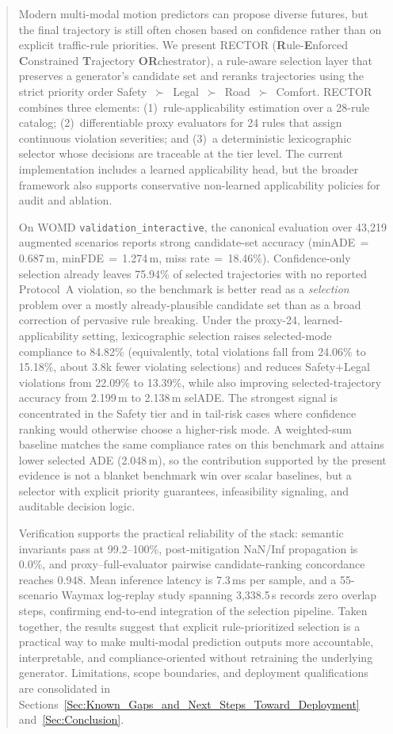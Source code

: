 \documentclass[lettersize,journal, twocolumn]{IEEEtran}
\begin{document}
\begin{abstract}
Modern multi-modal motion predictors can propose diverse futures, but the final trajectory is still often chosen based on confidence rather than on explicit traffic-rule priorities.  We present \textsc{RECTOR} (\textbf{R}ule-\textbf{E}nforced \textbf{C}onstrained \textbf{T}rajectory \textbf{OR}chestrator), a rule-aware selection layer that preserves a generator's candidate set and reranks trajectories using the strict priority order Safety~$\succ$~Legal~$\succ$~Road~$\succ$~Comfort.  \textsc{RECTOR} combines three elements: (1)~rule-applicability estimation over a 28-rule catalog; (2)~differentiable proxy evaluators for 24 rules that assign continuous violation severities; and (3)~a deterministic lexicographic selector whose decisions are traceable at the tier level.  The current implementation includes a learned applicability head, but the broader framework also supports conservative non-learned applicability policies for audit and ablation.

On WOMD \texttt{validation\_interactive}, the canonical evaluation over 43{,}219 augmented scenarios reports strong candidate-set accuracy (minADE\,$=$\,0.687\,m, minFDE\,$=$\,1.274\,m, miss rate\,$=$\,18.46\%).  Confidence-only selection already leaves 75.94\% of selected trajectories with no reported Protocol~A violation, so the benchmark is better read as a \emph{selection} problem over a mostly already-plausible candidate set than as a broad correction of pervasive rule breaking.  Under the proxy-24, learned-applicability setting, lexicographic selection raises selected-mode compliance to 84.82\% (equivalently, total violations fall from 24.06\% to 15.18\%, about 3.8k fewer violating selections) and reduces Safety$+$Legal violations from 22.09\% to 13.39\%, while also improving selected-trajectory accuracy from 2.199\,m to 2.138\,m selADE.  The strongest signal is concentrated in the Safety tier and in tail-risk cases where confidence ranking would otherwise choose a higher-risk mode.  A weighted-sum baseline matches the same compliance rates on this benchmark and attains lower selected ADE (2.048\,m), so the contribution supported by the present evidence is not a blanket benchmark win over scalar baselines, but a selector with explicit priority guarantees, infeasibility signaling, and auditable decision logic.

Verification supports the practical reliability of the stack: semantic invariants pass at 99.2--100\%, post-mitigation NaN/Inf propagation is 0.0\%, and proxy--full-evaluator pairwise candidate-ranking concordance reaches 0.948.  Mean inference latency is 7.3\,ms per sample, and a 55-scenario Waymax log-replay study spanning 3{,}338.5\,s records zero overlap steps, confirming end-to-end integration of the selection pipeline.  Taken together, the results suggest that explicit rule-prioritized selection is a practical way to make multi-modal prediction outputs more accountable, interpretable, and compliance-oriented without retraining the underlying generator.  Limitations, scope boundaries, and deployment qualifications are consolidated in Sections~\ref{Sec:Known_Gaps_and_Next_Steps_Toward_Deployment} and~\ref{Sec:Conclusion}.
\end{abstract}
\end{document}
